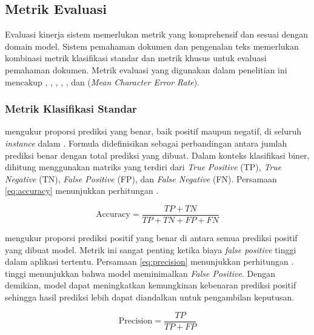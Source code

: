 \subsection{Metrik Evaluasi}
\label{subsec:metrik-evaluasi}

Evaluasi kinerja sistem \ml{} memerlukan metrik yang komprehensif dan sesuai dengan domain model. Sistem pemahaman dokumen dan pengenalan teks memerlukan kombinasi metrik klasifikasi standar dan metrik khusus untuk evaluasi pemahaman dokumen. Metrik evaluasi yang digunakan dalam penelitian ini mencakup \accuracy, \precision, \recall, \fscore, \coverage, dan \mcer{} (\emph{Mean Character Error Rate}).

\subsubsection{Metrik Klasifikasi Standar}

\accuracyfl{} mengukur proporsi prediksi yang benar, baik positif maupun negatif, di seluruh \emph{instance} dalam \dataset. Formula \accuracy{} didefinisikan sebagai perbandingan antara jumlah prediksi benar dengan total prediksi yang dibuat. Dalam konteks klasifikasi biner, \accuracy{} dihitung menggunakan matriks yang terdiri dari \emph{True Positive} (TP), \emph{True Negative} (TN), \emph{False Positive} (FP), dan \emph{False Negative} (FN). Persamaan \eqref{eq:accuracy} menunjukkan perhitungan \accuracy{} \parencite{jayaswal2020evalmetrics}. 

\begin{equation}
    \label{eq:accuracy}
\text{Accuracy} = \frac{TP + TN}{TP + TN + FP + FN}
\end{equation}

\precisionfl{} mengukur proporsi prediksi positif yang benar di antara semua prediksi positif yang dibuat model. Metrik ini sangat penting ketika biaya \emph{false positive} tinggi dalam aplikasi tertentu. Persamaan \eqref{eq:precision} menunjukkan perhitungan \precision. \precisionfl{} tinggi menunjukkan bahwa model meminimalkan \emph{False Positive}. Dengan demikian, model dapat meningkatkan kemungkinan kebenaran prediksi positif sehingga hasil prediksi lebih dapat diandalkan untuk pengambilan keputusan.

\begin{equation}
    \label{eq:precision}
\text{Precision} = \frac{TP}{TP + FP}
\end{equation}

